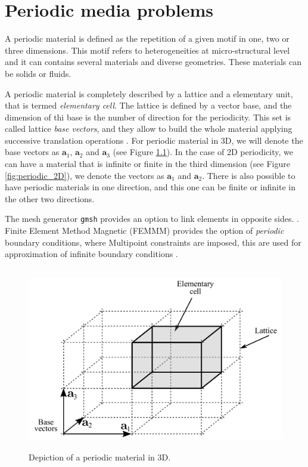 %
\chapter{Periodic media problems}

A periodic material is defined as the repetition of a given motif in one, two or three dimensions. This motif refers to heterogeneities at micro-structural level and it can contains several materials and diverse geometries. These materials can be solids or fluids.

A periodic material is completely described by a lattice and a elementary unit, that is termed \emph{elementary cell}. The lattice is defined by a vector base, and the dimension of thi base is the number of direction for the periodicity.  This set is called lattice \emph{base vectors}, and they allow to build the whole material applying successive translation operations \cite{book:brillouin2003}. For periodic material in 3D, we will denote the base vectors as $\mathbf{a}_1$, $\mathbf{a}_2$ and $\mathbf{a}_3$ (see Figure \ref{fig:periodic_3D}). In the case of 2D periodicity, we can have a material that is infinite or finite in the third dimension (see Figure \ref{fig:periodic_2D}), we denote the vectors as $\mathbf{a}_1$ and $\mathbf{a}_2$. There is also possible to have periodic materials in one direction, and this one can be finite or infinite in the other two directions.

The mesh generator \texttt{gmsh} provides an option to link elements in opposite sides.
\cite{gmsh_manual}. Finite Element Method Magnetic (FEMMM) provides the option of \emph{periodic} boundary conditions, where Multipoint constraints are imposed, this are used for approximation of infinite boundary conditions \cite{FEMM_manual}.

\begin{figure}[h]
\centering
\includegraphics[height=8cm]{img/periodic_3D.pdf} 
\caption{Depiction of a periodic material in 3D.}
\label{fig:periodic_3D}
\end{figure}

